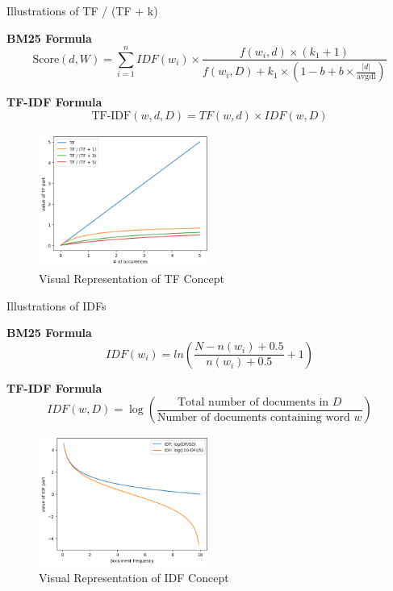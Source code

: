 \documentclass{beamer}
\begin{document}
\begin{frame}{Illustrations of TF / (TF + k)}

\textbf{BM25 Formula}
\[ \text{Score}(d, W) = \sum_{i=1}^{n} IDF(w_i) \times \frac{f(w_i, d) \times (k_1 + 1)}{f(w_i, D) + k_1 \times (1 - b + b \times \frac{|d|}{\text{avgdl}})} \]

\textbf{TF-IDF Formula}
\[ \text{TF-IDF}(w, d, D) = TF(w, d) \times IDF(w, D) \]

\begin{figure}
  \centering
  \includegraphics[width=0.5\textwidth]{figures/tf.png}
  \caption{Visual Representation of TF Concept}
\end{figure}

\end{frame}

\begin{frame}{Illustrations of IDFs}

\textbf{BM25 Formula}
\[ IDF(w_i) = ln(\frac{N - n(w_i) + 0.5}{n(w_i) + 0.5} + 1) \]

\textbf{TF-IDF Formula}
\[ IDF(w, D) = \log \left(\frac{\text{Total number of documents in } D}{\text{Number of documents containing word } w}\right) \]

\begin{figure}
  \centering
  \includegraphics[width=0.5\textwidth]{figures/idf.png}
  \caption{Visual Representation of IDF Concept}
\end{figure}

\end{frame}
\end{document}
